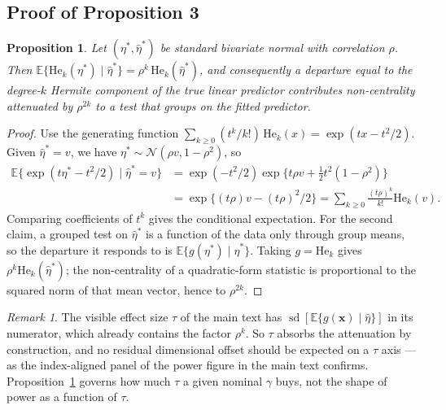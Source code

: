 \documentclass[11pt,a4paper]{article}
\DeclareMathOperator{\sd}{sd}
\theoremstyle{plain}
\newtheorem{proposition}{Proposition}
\theoremstyle{remark}
\newtheorem{remark}{Remark}
\begin{document}
\subsection{Proof of Proposition 3}\label{sec:proof3}

\begin{proposition}\label{prop:atten}
Let $(\eta^{\ast},\hat\eta^{\ast})$ be standard bivariate normal with correlation $\rho$.
Then $\mathbb{E}\{\mathrm{He}_k(\eta^{\ast}) \mid \hat\eta^{\ast}\}
= \rho^{k}\,\mathrm{He}_k(\hat\eta^{\ast})$, and consequently a departure equal to the
degree-$k$ Hermite component of the true linear predictor contributes non-centrality
attenuated by $\rho^{2k}$ to a test that groups on the fitted predictor.
\end{proposition}

\begin{proof}
Use the generating function $\sum_{k\ge0} (t^k/k!)\,\mathrm{He}_k(x) = \exp(tx - t^2/2)$.
Given $\hat\eta^{\ast} = v$, we have $\eta^{\ast} \sim \mathcal{N}(\rho v, 1-\rho^{2})$, so
\begin{align*}
  \mathbb{E}\bigl\{\exp(t\eta^{\ast} - t^{2}/2) \mid \hat\eta^{\ast} = v\bigr\}
  &= \exp(-t^{2}/2)\exp\bigl\{t\rho v + \tfrac12 t^{2}(1-\rho^{2})\bigr\} \\
  &= \exp\bigl\{(t\rho)v - (t\rho)^{2}/2\bigr\}
   = \sum_{k\ge0}\frac{(t\rho)^{k}}{k!}\mathrm{He}_k(v).
\end{align*}
Comparing coefficients of $t^{k}$ gives the conditional expectation. For the second
claim, a grouped test on $\hat\eta^{\ast}$ is a function of the data only through group
means, so the departure it responds to is
$\mathbb{E}\{g(\eta^{\ast}) \mid \hat\eta^{\ast}\}$. Taking
$g = \mathrm{He}_k$ gives $\rho^{k}\mathrm{He}_k(\hat\eta^{\ast})$; the non-centrality of a
quadratic-form statistic is proportional to the squared norm of that mean vector, hence
to $\rho^{2k}$.
\end{proof}

\begin{remark}\label{rem:tauabsorbs}
The visible effect size $\tau$ of the main text has
$\sd[\mathbb{E}\{g(\boldsymbol{x})\mid\hat\eta\}]$ in its numerator, which already
contains the factor $\rho^{k}$. So $\tau$ absorbs the attenuation by construction, and no
residual dimensional offset should be expected on a $\tau$ axis --- as
the index-aligned panel of the power figure in the main text confirms. Proposition~\ref{prop:atten} governs how much
$\tau$ a given nominal $\gamma$ buys, not the shape of power as a function of $\tau$.
\end{remark}
\end{document}
